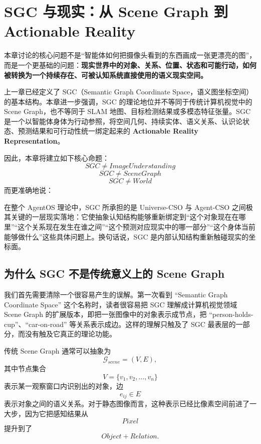 \chapter{SGC 与现实：从 Scene Graph 到 Actionable Reality}
\label{chap:sgc-reality}

\begin{chapterlead}
本章讨论的核心问题不是“智能体如何把摄像头看到的东西画成一张更漂亮的图”，而是一个更基础的问题：\textbf{现实世界中的对象、关系、位置、状态和可能行动，如何被转换为一个持续存在、可被认知系统直接使用的语义现实空间。}

上一章已经定义了 SGC（Semantic Graph Coordinate Space，语义图坐标空间）的基本结构。本章进一步强调，SGC 的理论地位并不等同于传统计算机视觉中的 Scene Graph，也不等同于 SLAM 地图、目标检测结果或多模态特征张量。SGC 是一个以智能体身体为行动参照，将空间几何、持续实体、语义关系、认识论状态、预测结果和可行动性统一绑定起来的 \textbf{Actionable Reality Representation}。

因此，本章将建立如下核心命题：
\[
\boxed{
SGC \neq ImageUnderstanding
}
\]
\[
\boxed{
SGC \neq SceneGraph
}
\]
\[
\boxed{
SGC \neq World
}
\]
而更准确地说：
\begin{statementbox}
\centering
{}
\end{statementbox}

在整个 AgentOS 理论中，SGC 所承担的是 Universe-CSO 与 Agent-CSO 之间极其关键的一层现实落地：它使抽象认知结构能够重新绑定到“这个对象现在在哪里”“这个关系现在发生在谁之间”“这个预测对应现实中的哪一部分”“这个身体当前能够做什么”这些具体问题上。换句话说，SGC 是内部认知结构重新触碰现实的坐标面。
\end{chapterlead}

\section{为什么 SGC 不是传统意义上的 Scene Graph}

我们首先需要清除一个很容易产生的误解。第一次看到 ``Semantic Graph Coordinate Space'' 这个名称时，读者很容易把 SGC 理解成计算机视觉领域 Scene Graph 的扩展版本，即把一张图像中的对象表示成节点，把 ``person-holds-cup''、``car-on-road'' 等关系表示成边。这样的理解只触及了 SGC 最表层的一部分，而没有触及它真正的理论功能。

传统 Scene Graph 通常可以抽象为
\[
\mathcal{G}_{scene}
=
(V,E),
\]
其中节点集合
\[
V=\{v_1,v_2,\ldots,v_n\}
\]
表示某一观察窗口内识别出的对象，边
\[
e_{ij}\in E
\]
表示对象之间的语义关系。对于静态图像而言，这种表示已经比像素空间前进了一大步，因为它把感知结果从
\[
Pixel
\]
提升到了
\[
Object + Relation.
\]

